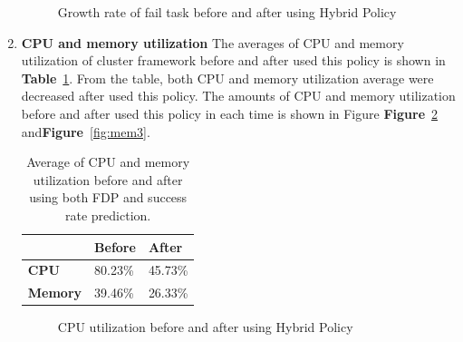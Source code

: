 \documentclass[12pt,oneside,openright,a4paper]{cpe-english-project}
\begin{document}
\begin{enumerate}
\begin{figure}[!h]
    \caption{Growth rate of fail task before and after using Hybrid Policy}\label{fig:fail3}
\end{figure}

  \item \textbf{CPU and memory utilization}
  \newline
The averages of CPU and memory utilization of cluster framework before and after used this policy is shown in \textbf{Table}~\ref{tbl:po3CPUMem}. From the table, both CPU and memory utilization average were decreased after used this policy. The amounts of CPU and memory utilization before and after used this policy in each time is shown in Figure \textbf{Figure}~\ref{fig:cpu3} and\textbf{Figure}~\ref{fig:mem3}.    
  \begin{table}[!h]
  \caption{Average of CPU and memory utilization before and after using both FDP and success rate prediction.}\label{tbl:po3CPUMem}
  \begin{tabular}{@{}|p{}|p{}|p{}|}
   \hline
   \textbf{} & \textbf{Before} & \textbf{After} \\ 
   \hline
   \textbf{CPU} & 80.23\% & 45.73\% \\ 
   \hline
   \textbf{Memory} & 39.46\% & 26.33\% \\ 
   \hline                     
  \end{tabular}
\end{table}
\begin{figure}[!h]\centering
    \setlength{\fboxrule}{0mm} %
    \setlength{\fboxsep}{0cm}
    \caption{CPU utilization before and after using Hybrid Policy}\label{fig:cpu3}
\end{figure}
\begin{figure}[!h]\centering
    \setlength{\fboxrule}{0mm} %

\end{figure}
\end{enumerate}
\end{document}
